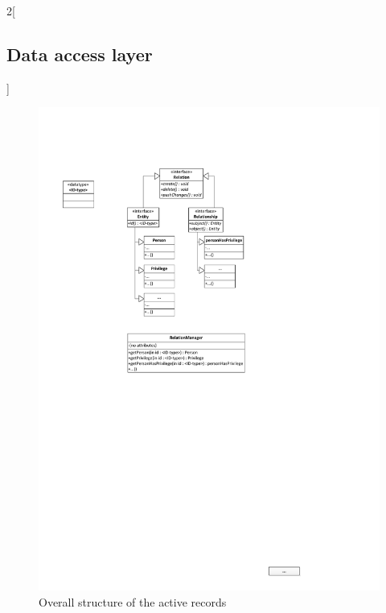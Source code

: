 \begin{multicols}{2}[\subsection{Data access layer}]
\begin{figure}[H]
	\centering
		\includegraphics[width=\columnwidth]{images/UML-active-records.pdf}
	\caption{Overall structure of the active records}
	\label{fig:data-access-layer}
\end{figure}

\end{multicols}
